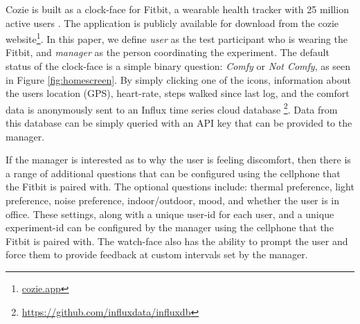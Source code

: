 
Cozie is built as a clock-face for Fitbit, a wearable health tracker with 25 million active users \cite{fibit2018}. The application is publicly available for download from the cozie website\footnote{\url{cozie.app}}. In this paper, we define \emph{user} as the test participant who is wearing the Fitbit, and \emph{manager} as the person coordinating the experiment. The default status of the clock-face is a simple binary question: \emph{Comfy} or \emph{Not Comfy}, as seen in Figure \ref{fig:homescreen}. By simply clicking one of the icons, information about the users location (GPS), heart-rate, steps walked since last log, and the comfort data is anonymously sent to an Influx time series cloud database \footnote{\url{https://github.com/influxdata/influxdb}}. Data from this database can be simply queried with an API key that can be provided to the manager. 

If the manager is interested as to why the user is feeling discomfort, then there is a range of additional questions that can be configured using the cellphone that the Fitbit is paired with. The optional questions include: thermal preference, light preference, noise preference, indoor/outdoor, mood, and whether the user is in office. These settings, along with a unique user-id for each user, and a unique experiment-id can be configured by the manager using the cellphone that the Fitbit is paired with. The watch-face also has the ability to prompt the user and force them to provide feedback at custom intervals set by the manager.



